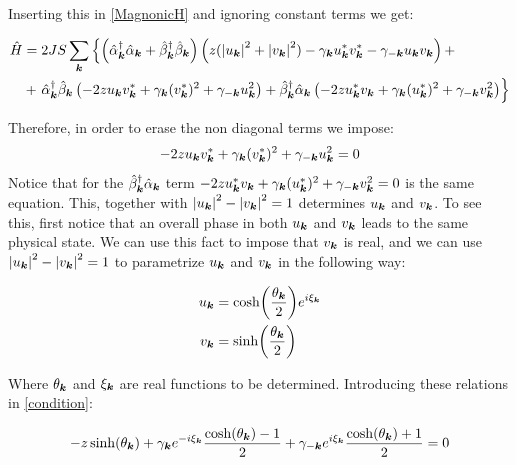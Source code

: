 Inserting this in \ref{MagnonicH} and ignoring constant terms we get:

\begin{align}
\hat{H} &= 2JS \sum_{\boldsymbol{k}} \left\{ \left( \hat{\alpha}_{\boldsymbol{k}}^\dagger \hat{\alpha}_{\boldsymbol{k}} +\hat{\beta}_{\boldsymbol{k}}^\dagger \hat{\beta}_{\boldsymbol{k}} \right) \left( z(\abs{u_{\boldsymbol{k}}}^2+\abs{v_{\boldsymbol{k}}}^2) -\gamma_{\boldsymbol{k}}u_{\boldsymbol{k}}^*v_{\boldsymbol{k}}^* - \gamma_{-\boldsymbol{k}}u_{\boldsymbol{k}}v_{\boldsymbol{k}} \right) + \right. \nonumber \\
&+ \left.  \hat{\alpha}^\dagger_{\boldsymbol{k}} \hat{\beta}_{\boldsymbol{k}} \left( -2zu_{\boldsymbol{k}}v_{\boldsymbol{k}}^* + \gamma_{\boldsymbol{k}}(v_{\boldsymbol{k}}^*)^2+\gamma_{-\boldsymbol{k}}u_{\boldsymbol{k}}^2 \right) + \hat{\beta}_{\boldsymbol{k}}^\dagger\hat{\alpha}_{\boldsymbol{k}} \left( -2zu_{\boldsymbol{k}}^*v_{\boldsymbol{k}} + \gamma_{\boldsymbol{k}}(u_{\boldsymbol{k}}^*)^2+\gamma_{-\boldsymbol{k}}v_{\boldsymbol{k}}^2 \right) \right\} \label{BeforeBogo}
\end{align}

Therefore, in order to erase the non diagonal terms we impose:
\begin{equation}
\label{condition}
-2zu_{\boldsymbol{k}}v_{\boldsymbol{k}}^* + \gamma_{\boldsymbol{k}}(v_{\boldsymbol{k}}^*)^2+\gamma_{-\boldsymbol{k}}u_{\boldsymbol{k}}^2 = 0
\end{equation}
Notice that for the $\hat{\beta}_{\boldsymbol{k}}^\dagger\hat{\alpha}_{\boldsymbol{k}}$ term $-2zu_{\boldsymbol{k}}^*v_{\boldsymbol{k}} + \gamma_{\boldsymbol{k}}(u_{\boldsymbol{k}}^*)^2+\gamma_{-\boldsymbol{k}}v_{\boldsymbol{k}}^2=0$ is the same equation. This, together with $\abs{u_{\boldsymbol{k}}}^2-\abs{v_{\boldsymbol{k}}}^2 = 1$ determines $u_{\boldsymbol{k}}$ and $v_{\boldsymbol{k}}$. To see this, first notice that an overall phase in both $u_{\boldsymbol{k}}$ and $v_{\boldsymbol{k}}$ leads to the same physical state. We can use this fact to impose that $v_{\boldsymbol{k}}$ is real, and we can use $\abs{u_{\boldsymbol{k}}}^2-\abs{v_{\boldsymbol{k}}}^2 = 1$ to parametrize $u_{\boldsymbol{k}}$ and $v_{\boldsymbol{k}}$ in the following way:

\begin{align*}
u_{\boldsymbol{k}} &= \cosh(\frac{\theta_{\boldsymbol{k}}}{2})e^{i \xi_{\boldsymbol{k}}} \\
v_{\boldsymbol{k}} &= \sinh(\frac{\theta_{\boldsymbol{k}}}{2})
\end{align*}

Where $\theta_{\boldsymbol{k}}$ and $\xi_{\boldsymbol{k}}$ are real functions to be determined. Introducing these relations in \ref{condition}:

\begin{equation}
- z\sinh(\theta_{\boldsymbol{k}}) +\gamma_{\boldsymbol{k}}e^{-i \xi_{\boldsymbol{k}}}\frac{ \cosh(\theta_{\boldsymbol{k}})-1}{2} +\gamma_{-\boldsymbol{k}}e^{i\xi_{\boldsymbol{k}}}\frac{ \cosh(\theta_{\boldsymbol{k}})+1}{2} = 0
\end{equation}

